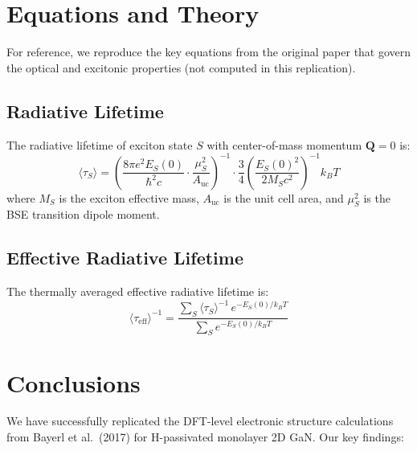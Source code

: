 \documentclass[11pt]{article}
\begin{document}
\section{Equations and Theory}

For reference, we reproduce the key equations from the original paper that govern the optical and excitonic properties (not computed in this replication).

\subsection{Radiative Lifetime}

The radiative lifetime of exciton state $S$ with center-of-mass momentum $\mathbf{Q} = 0$ is:
\begin{equation}
\langle \tau_S \rangle = \left( \frac{8\pi e^2 E_S(0)}{\hbar^2 c} \cdot \frac{\mu_S^2}{A_{\mathrm{uc}}} \right)^{-1} \cdot \frac{3}{4} \left( \frac{E_S(0)^2}{2 M_S c^2} \right)^{-1} k_B T
\label{eq:lifetime}
\end{equation}
where $M_S$ is the exciton effective mass, $A_{\mathrm{uc}}$ is the unit cell area, and $\mu_S^2$ is the BSE transition dipole moment.

\subsection{Effective Radiative Lifetime}

The thermally averaged effective radiative lifetime is:
\begin{equation}
\langle \tau_{\mathrm{eff}} \rangle^{-1} = \frac{\sum_S \langle \tau_S \rangle^{-1} \, e^{-E_S(0)/k_B T}}{\sum_S e^{-E_S(0)/k_B T}}
\label{eq:lifetime_eff}
\end{equation}

\section{Conclusions}

We have successfully replicated the DFT-level electronic structure calculations from Bayerl et al.\ (2017) for H-passivated monolayer 2D GaN. Our key findings:
\end{document}
